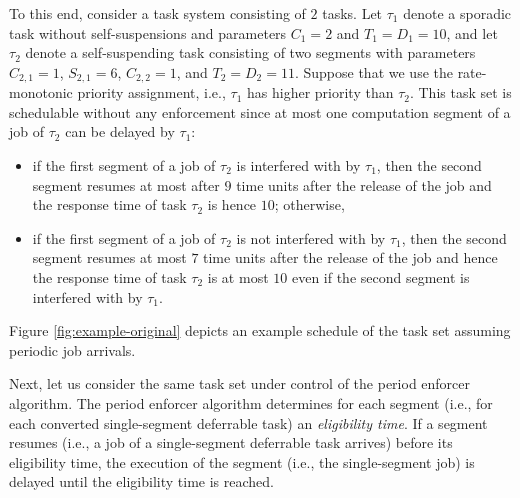 To this end, consider a task system consisting of $2$ tasks. Let $\tau_1$ denote a sporadic task without self-suspensions and parameters $C_1 = 2$ and $T_1=D_1=10$, and let $\tau_2$ denote a self-suspending task consisting of two segments with parameters  $C_{2,1} = 1$,  $S_{2,1} = 6$, $C_{2,2}=1$, and $ T_2=D_2=11$. Suppose that we use the rate-monotonic priority assignment, i.e., $\tau_1$ has higher priority than $\tau_2$. This task set is schedulable without any enforcement since at most one computation segment of a job of $\tau_2$ can be delayed by $\tau_1$: 
\begin{itemize}
	\item if the first segment of a job of $\tau_2$ is interfered with by $\tau_1$, then the second segment resumes at most after $9$ time units after the release of the job and the response time of task $\tau_2$ is hence $10$; otherwise,
	\item  if the first segment of a job of $\tau_2$ is not interfered with by $\tau_1$, then the second segment resumes at most $7$ time units after the release of the job and hence the  response time of task $\tau_2$ is at most $10$ even if the second segment is interfered with by $\tau_1$.
\end{itemize}
Figure \ref{fig:example-original} depicts an example schedule of the task set assuming periodic job arrivals.



Next, let us consider the same task set under control of the period enforcer algorithm.
The period enforcer algorithm determines for each segment (i.e., for each converted single-segment deferrable task) an \emph{eligibility time}. If a segment resumes (i.e., a job of a single-segment deferrable task arrives) before its eligibility time, the execution of the segment (i.e., the single-segment job) is delayed until the eligibility time is reached.

